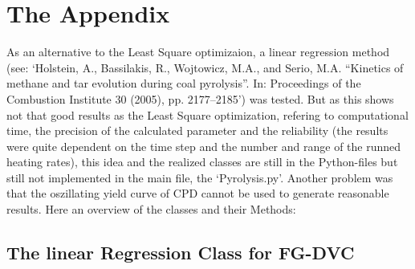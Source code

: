 \documentclass[letterpaper,10pt,english]{sphinxmanual}
\begin{document}
\chapter{The Appendix}
\label{Appendix:the-appendix}\label{Appendix::doc}
As an alternative to the Least Square optimizaion, a linear regression method (see: `Holstein, A., Bassilakis, R., Wojtowicz, M.A., and Serio, M.A. “Kinetics of methane and tar
evolution during coal pyrolysis”. In: Proceedings of the Combustion Institute 30 (2005), pp. 2177–2185') was tested. But as this shows not that good results as the Least Square optimization, refering to computational time, the precision of the calculated parameter and the reliability (the results were quite dependent on the time step and the number and range of the runned heating rates), this idea and the realized classes are still in the Python-files but still not implemented in the main file, the `Pyrolysis.py'. Another problem was that the oszillating yield curve of CPD cannot be used to generate reasonable results.
Here an overview of the classes and their Methods:


\section{The linear Regression Class for FG-DVC}
\label{Appendix:the-linear-regression-class-for-fg-dvc}
\end{document}
